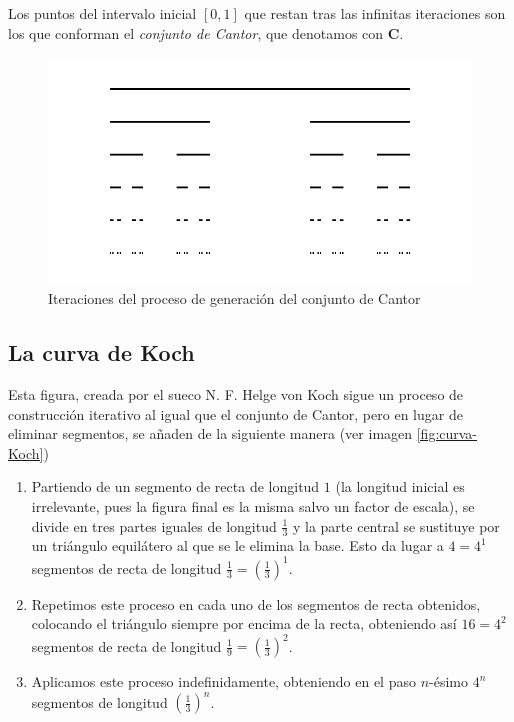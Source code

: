 \documentclass[11pt]{report}
\begin{document}
Los puntos del intervalo inicial $[0,1]$ que restan tras las infinitas iteraciones son los que conforman el \textit{conjunto de Cantor}, que denotamos con $\textbf{C}$.

\begin{figure} [h]
\centering
\includegraphics[scale = 0.5]{img/cantor.png}
\caption{Iteraciones del proceso de generación del conjunto de Cantor}
 \label{fig:Cantor}
\end{figure}

\subsection{La curva de Koch}
\label{subsection:curva-Koch}

Esta figura, creada por el sueco N. F. Helge von Koch sigue un proceso de construcción iterativo al igual que el conjunto de Cantor, pero en lugar de eliminar segmentos, se añaden de la siguiente manera (ver imagen \ref{fig:curva-Koch})

\begin{enumerate}
\item Partiendo de un segmento de recta de longitud $1$ (la longitud inicial es irrelevante, pues la figura final es la misma salvo un factor de escala), se divide en tres partes iguales de longitud $\frac 1 3$ y la parte central se sustituye por un triángulo equilátero al que se le elimina la base. Esto da lugar a $4=4^1$ segmentos de recta de longitud $\frac 1 3=\left(\frac 1 3\right)^1$.

\item Repetimos este proceso en cada uno de los segmentos de recta obtenidos, colocando el triángulo siempre por encima de la recta, obteniendo así $16=4^2$ segmentos de recta de longitud $\frac 1 9=\left(\frac 1 3\right)^2$.

\item Aplicamos este proceso indefinidamente, obteniendo en el paso $n$-ésimo $4^n$ segmentos de longitud $\left(\frac 1 3\right)^n$. 
\end{enumerate}
\end{document}
